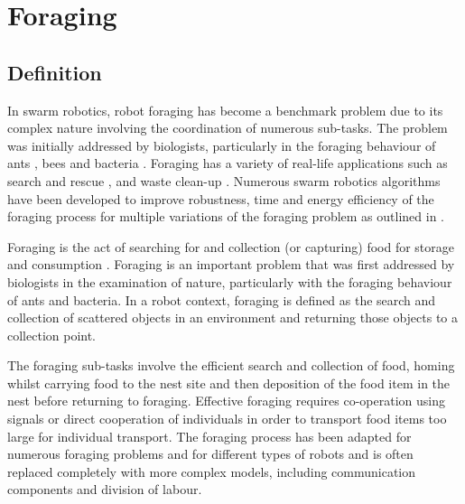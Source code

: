 
\chapter{Foraging}
\label{chap:second}





\section{Definition}
\label{sec:second:definition}

In swarm robotics, robot foraging has become a benchmark problem due to its complex nature involving the coordination of numerous sub-tasks. The problem was initially addressed by biologists, particularly in the foraging behaviour of ants \cite{holldobler1990ants,bernstein1974seasonal}, bees \cite{seeley2009wisdom} and bacteria \cite{resnick1994turtles}. Foraging has a variety of real-life applications such as search and rescue \cite{jennings1997cooperative,murphy2000biomimetic}, and waste clean-up \cite{balch1995io}. Numerous swarm robotics algorithms have been developed to improve robustness, time and energy efficiency of the foraging process for multiple variations of the foraging problem as outlined in \cite{winfield2009foraging}. 

Foraging is the act of searching for and collection (or capturing) food for storage and consumption \cite{winfield2009foraging}. Foraging is an important problem that was first addressed by biologists in the examination of nature, particularly with the foraging behaviour of ants and bacteria. In a robot context, foraging is defined as the search and collection of scattered objects in an environment and returning those objects to a collection point.

The foraging sub-tasks involve the efficient search and collection of food, homing whilst carrying food to the nest site and then deposition of the food item in the nest before returning to foraging. Effective foraging requires co-operation using signals or direct cooperation of individuals in order to transport food items too large for individual transport. The foraging process has been adapted for numerous foraging problems and for different types of robots and is often replaced completely with more complex models, including communication components and division of labour. 

